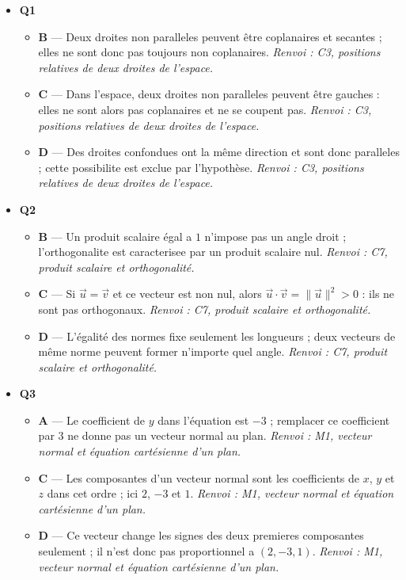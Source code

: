 \begin{itemize}
  \item \textbf{Q1}
  \begin{itemize}
    \item \textbf{B} — Deux droites non paralleles peuvent être coplanaires et secantes ; elles ne sont donc pas toujours non coplanaires. \emph{Renvoi : C3, positions relatives de deux droites de l'espace.}
    \item \textbf{C} — Dans l'espace, deux droites non paralleles peuvent être gauches : elles ne sont alors pas coplanaires et ne se coupent pas. \emph{Renvoi : C3, positions relatives de deux droites de l'espace.}
    \item \textbf{D} — Des droites confondues ont la même direction et sont donc paralleles ; cette possibilite est exclue par l'hypothèse. \emph{Renvoi : C3, positions relatives de deux droites de l'espace.}
  \end{itemize}
  \item \textbf{Q2}
  \begin{itemize}
    \item \textbf{B} — Un produit scalaire égal a $1$ n'impose pas un angle droit ; l'orthogonalite est caracterisee par un produit scalaire nul. \emph{Renvoi : C7, produit scalaire et orthogonalité.}
    \item \textbf{C} — Si $\vec u=\vec v$ et ce vecteur est non nul, alors $\vec u\cdot\vec v=\|\vec u\|^2>0$ : ils ne sont pas orthogonaux. \emph{Renvoi : C7, produit scalaire et orthogonalité.}
    \item \textbf{D} — L'égalité des normes fixe seulement les longueurs ; deux vecteurs de même norme peuvent former n'importe quel angle. \emph{Renvoi : C7, produit scalaire et orthogonalité.}
  \end{itemize}
  \item \textbf{Q3}
  \begin{itemize}
    \item \textbf{A} — Le coefficient de $y$ dans l'équation est $-3$ ; remplacer ce coefficient par $3$ ne donne pas un vecteur normal au plan. \emph{Renvoi : M1, vecteur normal et équation cartésienne d'un plan.}
    \item \textbf{C} — Les composantes d'un vecteur normal sont les coefficients de $x$, $y$ et $z$ dans cet ordre ; ici $2$, $-3$ et $1$. \emph{Renvoi : M1, vecteur normal et équation cartésienne d'un plan.}
    \item \textbf{D} — Ce vecteur change les signes des deux premieres composantes seulement ; il n'est donc pas proportionnel a $(2,-3,1)$. \emph{Renvoi : M1, vecteur normal et équation cartésienne d'un plan.}

\end{itemize}
\end{itemize}
